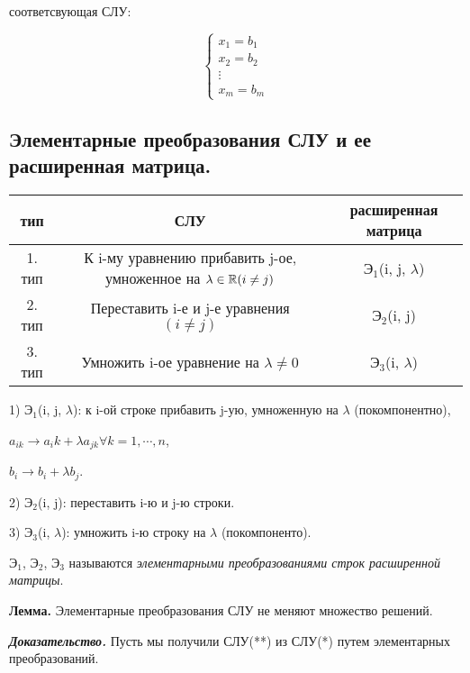 соответсвующая СЛУ:

\begin{equation*}
    \left\{
		\begin{aligned}
        x_1 = b_1 \\
        x_2 = b_2 \\
        \vdots \\
        x_m = b_m
		\end{aligned}
	\right.
\end{equation*}

\subsection{Элементарные преобразования СЛУ и ее расширенная матрица.}

\vspace{\baselineskip}
\begin{table}[!ht]
		\begin{tabular}{c|c|c}
    	тип & СЛУ & расширенная матрица \\
        \hline
        1. тип & К i-му уравнению прибавить j-ое, умноженное на $\lambda \in \mathbb{R} (i \neq j)$ & $Э_1$(i, j, $\lambda$) \\
        2. тип & Переставить i-е и j-е уравнения $(i \neq j)$  & $Э_2$(i, j) \\
        3. тип & Умножить i-ое уравнение на $\lambda \neq 0$ & $Э_3$(i, $\lambda$) 
		\end{tabular}
\end{table}

\vspace{\baselineskip}
1) $Э_1$(i, j, $\lambda$): к i-ой строке прибавить j-ую, умноженную на $\lambda$ (покомпонентно),

$a_{ik} \rightarrow a_ik + \lambda a_{jk} \forall k = 1, \cdots, n$,

$b_i \rightarrow b_i + \lambda b_j$.

2) $Э_2$(i, j): переставить i-ю и j-ю строки.

3) $Э_3$(i, $\lambda$): умножить i-ю строку на $\lambda$ (покомпоненто).

\vspace{\baselineskip}
$Э_1$, $Э_2$, $Э_3$ называются \textit{элементарными преобразованиями строк расширенной матрицы}.

\vspace{\baselineskip}
\textbf{Лемма.} Элементарные преобразования СЛУ не меняют множество решений.

\vspace{\baselineskip}
\textbf{\textit{Доказательство.}} Пусть мы получили СЛУ(**) из СЛУ(*) путем элементарных преобразований.

